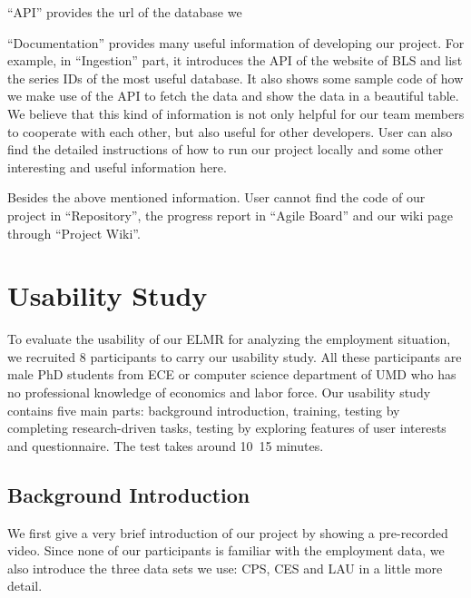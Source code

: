 \documentclass{sigchi}
\begin{document}
``API'' provides the url of the database we

``Documentation'' provides many useful information of developing our project. For example, in ``Ingestion'' part, it introduces the API of the website of BLS and list the series IDs of the most useful database. It also shows some sample code of how we make use of the API to fetch the data and show the data in a beautiful table. We believe that this kind of information is not only helpful for our team members to cooperate with each other, but also useful for other developers. User can also find the detailed instructions of how to run our project locally and some other interesting and useful information here.

Besides the above mentioned information. User cannot find the code of our project in ``Repository'', the progress report in ``Agile Board'' and our wiki page through ``Project Wiki''.


\section{Usability Study}

To evaluate the usability of our ELMR for analyzing the employment situation, we recruited 8 participants to carry our usability study. All these participants are male PhD students from ECE or computer science department of UMD who has no professional knowledge of economics and labor force. Our usability study contains five main parts: background introduction, training, testing by completing research-driven tasks, testing by exploring features of user interests and questionnaire. The test takes around 10~15 minutes.

\subsection{Background Introduction}
We first give a very brief introduction of our project by showing a pre-recorded video. Since none of our participants is familiar with the employment data, we also introduce the three data sets we use: CPS, CES and LAU in a little more detail.
\end{document}
